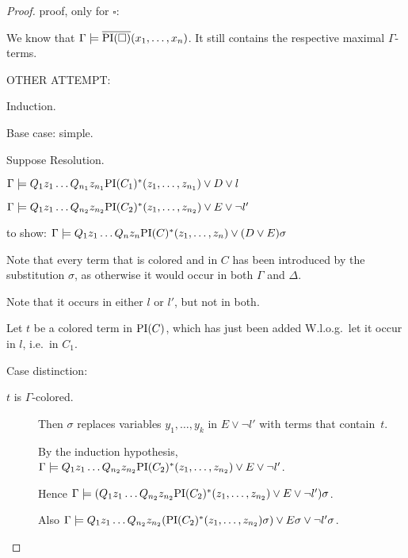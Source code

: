 \begin{proof}

	proof, only for $\square$:

	We know that $\Gamma \entails \overline{\PI(\square)}(x_1, \ldots, x_{n})$.
	It still contains the respective maximal $\Gamma$-terms.

	\bigskip

	{
		OTHER ATTEMPT:

	Induction.

	Base case: simple.

	Suppose Resolution.
	\begin{prooftree}
	\end{prooftree}

	$\Gamma \entails Q_1 z_1 \ldots Q_{n_1} z_{n_1} \PI(C_1)^*(z_1, \ldots, z_{n_1})  \lor D \lor l$

	$\Gamma \entails Q_1 z_1 \ldots Q_{n_2} z_{n_2} \PI(C_2)^*(z_1, \ldots, z_{n_2})  \lor E \lor \lnot l'$

	to show:
	$\Gamma \entails Q_1 z_1 \ldots Q_{n} z_{n} \PI(C)^*(z_1, \ldots, z_{n})  \lor (D \lor E)\sigma$

	Note that every term that is colored and in $C$ has been introduced by the substitution $\sigma$, as otherwise it would occur in both $\Gamma$ and $\Delta$.

	Note that it occurs in either $l$ or $l'$, but not in both.

	Let $t$ be a colored term in $\PI(C)$, which has just been added
	W.l.o.g.\ let it occur in $l$, i.e.\ in $C_1$.



	Case distinction:

	\begin{description}
		\item [$t$ is $\Gamma$-colored.]
			Then $\sigma$ replaces variables $y_1, \ldots, y_k$ in $E \lor \lnot l'$ with terms that contain~$t$.

			By the induction hypothesis, $\Gamma \entails Q_1 z_1 \ldots Q_{n_2} z_{n_2} \PI(C_2)^*(z_1, \ldots, z_{n_2})  \lor E \lor \lnot l'$.

			Hence $\Gamma \entails (Q_1 z_1 \ldots Q_{n_2} z_{n_2} \PI(C_2)^*(z_1, \ldots, z_{n_2})  \lor E \lor \lnot l' ) \sigma$.

			Also $\Gamma \entails Q_1 z_1 \ldots Q_{n_2} z_{n_2} (\PI(C_2)^*(z_1, \ldots, z_{n_2})\sigma)  \lor E\sigma \lor \lnot l'\sigma$.


\end{description}}
\end{proof}
